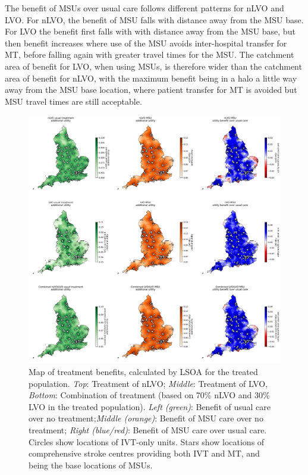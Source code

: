 The benefit of MSUs over usual care follows different patterns for nLVO and LVO. For nLVO, the benefit of MSU falls with distance away from the MSU base. For LVO the benefit first falls with with distance away from the MSU base, but then benefit increases where use of the MSU avoids inter-hospital transfer for MT, before falling again with greater travel times for the MSU. The catchment area of benefit for LVO, when using MSUs, is therefore wider than the catchment area of benefit for nLVO, with the maximum benefit being in a halo a little way away from the MSU base location, where patient transfer for MT is avoided but MSU travel times are still acceptable.


\begin{figure}[h]
    \centering
    \includegraphics[width=1\linewidth]{images/map_utility.jpg}
    \caption{Map of treatment benefits, calculated by LSOA for the treated population. \textit{Top}: Treatment of nLVO; \textit{Middle}: Treatment of LVO, \textit{Bottom}: Combination of treatment (based on 70\% nLVO and 30\% LVO in the treated population). \textit{Left (green)}: Benefit of usual care over no treatment;\textit{Middle (orange)}: Benefit of MSU care over no treatment; \textit{Right (blue/red)}: Benefit of MSU care over usual care. Circles show locations of IVT-only units. Stars show locations of comprehensive stroke centres providing both IVT and MT, and being the base locations of MSUs.}
    \label{fig:msu_map_utility}
\end{figure}

